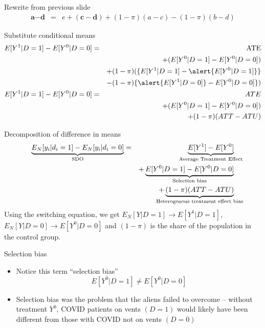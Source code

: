 \documentclass{beamer}
\begin{document}
\begin{frame}[shrink=20,plain]
  \begin{block}{Rewrite from previous slide}
    \begin{eqnarray*}
      \textbf{a}-\textbf{d}&=&e  + (\textbf{c} - \textbf{d}) + (1-\pi)(a-c) -(1-\pi)(b-d)
    \end{eqnarray*}
  \end{block}

  \begin{block}{Substitute conditional means}
    \begin{eqnarray*}
      E[Y^1|D=1] - E[Y^0|D=0] &=& \text{ATE}  \\
      &&+ (E[Y^0|D=1] - E[Y^0|D=0])  \\
      && + (1-\pi)(\{E[Y^1|D=1] - \alert{E[Y^0|D=1]}\}  \\
      && - (1-\pi)\{\alert{E[Y^1|D=0]} - E[Y^0|D=0]\}) \\
      E[Y^1 | D=1] - E[Y^0 | D=0]  &=& ATE \\
      &&+ (E[Y^0|D=1] - E[Y^0|D=0])  \\
      && + (1-\pi)(ATT - ATU)
    \end{eqnarray*}
  \end{block}
\end{frame}

\begin{frame}[plain]

  \begin{block}{Decomposition of difference in means}
    \begin{eqnarray*}
      \underbrace{E_N[y_i | d_i=1] - E_N[y_i | d_i=0]}_{ \mathclap{\text{SDO}}}&=& \underbrace{E[Y^1] - E[Y^0]}_{ \mathclap{\text{Average Treatment Effect}}} \\
      &&+ \underbrace{E[Y^0|D=1] - E[Y^0 | D=0]}_{ \mathclap{\text{Selection bias}}}  \\
      && + \underbrace{(1-\pi)(ATT - ATU)}_{ \mathclap{\text{Heterogenous treatment effect bias}}}
    \end{eqnarray*}
    Using the switching equation, we get $E_N[Y|D=1] \to E[Y^1 | D=1]$, $E_N[Y|D=0] \to E[Y^0|D=0]$ and $(1-\pi)$ is the share of the population in the control group.
  \end{block}

\end{frame}

\begin{frame}{Selection bias}

  \begin{itemize}
    \item Notice this term ``selection bias'' $$E[Y^0|D=1] \neq E[Y^0 |D=0]$$
    \item Selection bias was the problem that the aliens failed to overcome -- without treatment $Y^0$, COVID patients on vents $(D=1)$ would likely have been different from those with COVID not on vents $(D=0)$
  \end{itemize}

\end{frame}
\end{document}
